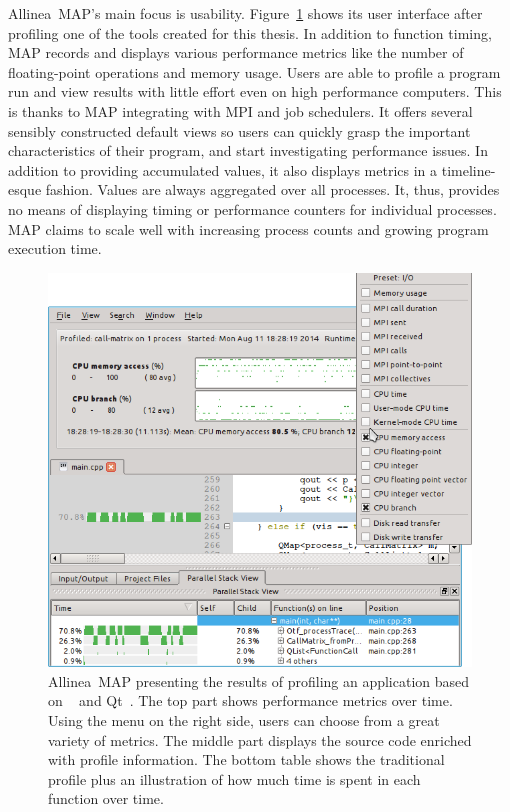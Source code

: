 \documentclass[a4paper, final, diplominf]{zih-template}
\begin{document}
Allinea~MAP's main focus is usability.
Figure~\ref{fig:allinea-map} shows its user interface after profiling one of the tools created for this thesis.
In addition to function timing, MAP records and displays various performance metrics like the number of floating-point operations and memory usage.
Users are able to profile a program run and view results with little effort even on high performance computers.
This is thanks to MAP integrating with MPI and job schedulers.
It offers several sensibly constructed default views so users can quickly grasp the important characteristics of their program, and start investigating performance issues.
In addition to providing accumulated values, it also displays metrics in a timeline-esque fashion.
Values are always aggregated over all processes.
It, thus, provides no means of displaying timing or performance counters for individual processes.
MAP claims to scale well with increasing process counts and growing program execution time.
\begin{figure}[tb]
	\centering
	\includegraphics[width=12.3cm]{allinea-map2} %
	\caption{Allinea~MAP presenting the results of profiling an application based on \cpp~\cite{cpp} and Qt~\cite{qt}. The top part shows performance metrics over time. Using the menu on the right side, users can choose from a great variety of metrics. The middle part displays the source code enriched with profile information. The bottom table shows the traditional profile plus an illustration of how much time is spent in each function over time.}
	\label{fig:allinea-map}
\end{figure}
\end{document}
